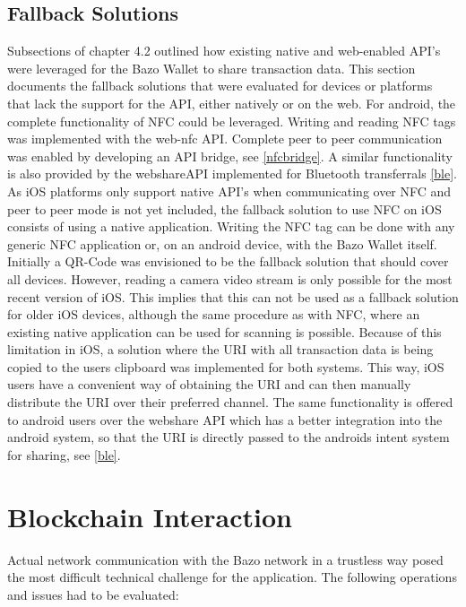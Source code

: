 \subsection{Fallback Solutions}\label{fallback}
Subsections of chapter 4.2 outlined how existing native and web-enabled API's were leveraged for the Bazo Wallet to share transaction data. This section documents the fallback solutions that were evaluated for devices or platforms that lack the support for the API, either natively or on the web.
For android, the complete functionality of NFC could be leveraged. Writing and reading NFC tags was implemented with the web-nfc API. Complete peer to peer communication was enabled by developing an API bridge, see \ref{nfcbridge}. A similar functionality is also provided by the webshareAPI implemented for Bluetooth transferrals \ref{ble}.
As iOS platforms only support native API's when communicating over NFC and peer to peer mode is not yet included, the fallback solution to use NFC on iOS consists of using a native application. Writing the NFC tag can be done with any generic NFC application or, on an android device, with the Bazo Wallet itself.
Initially a QR-Code was envisioned to be the fallback solution that should cover all devices. However, reading a camera video stream is only possible for the most recent version of iOS. This implies that this can not be used as a fallback solution for older iOS devices, although the same procedure as with NFC, where an existing native application can be used for scanning is possible.
Because of this limitation in iOS, a solution where the URI with all transaction data is being copied to the users clipboard was implemented for both systems. This way, iOS users have a convenient way of obtaining the URI and can then manually distribute the URI over their preferred channel. The same functionality is offered to android users over the webshare API which has a better integration into the android system, so that the URI is directly passed to the androids intent system for sharing, see \ref{ble}.

\section{Blockchain Interaction}\label{blockchaininteraction}
Actual network communication with the Bazo network in a trustless way posed the most difficult technical challenge for the application. The following operations and issues had to be evaluated:


